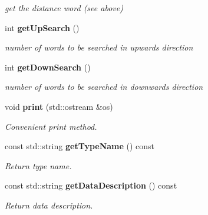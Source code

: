 \begin{DoxyCompactItemize}
\begin{DoxyCompactList}\small\item\em get the distance word (see above) \item\end{DoxyCompactList}\item 
int {\bf getUpSearch} ()\label{classCALICE_1_1TriggerCheck_af8a0117bed3941cb353693a7c3eface2}

\begin{DoxyCompactList}\small\item\em number of words to be searched in upwards direction \item\end{DoxyCompactList}\item 
int {\bf getDownSearch} ()\label{classCALICE_1_1TriggerCheck_a450b5f31d4d643303621dac8a09455bf}

\begin{DoxyCompactList}\small\item\em number of words to be searched in downwards direction \item\end{DoxyCompactList}\item 
void {\bf print} (std::ostream \&os)\label{classCALICE_1_1TriggerCheck_a2a2fd0d5f304e7d5c0ba892617bd84a1}

\begin{DoxyCompactList}\small\item\em Convenient print method. \item\end{DoxyCompactList}\item 
const std::string {\bf getTypeName} () const \label{classCALICE_1_1TriggerCheck_aaf8cece5cd4817d233e328c941c09563}

\begin{DoxyCompactList}\small\item\em Return type name. \item\end{DoxyCompactList}\item 
const std::string {\bf getDataDescription} () const \label{classCALICE_1_1TriggerCheck_a29fbc7d9375224b05332c577ef3279a5}

\begin{DoxyCompactList}\small\item\em Return data description. \item\end{DoxyCompactList}\end{DoxyCompactItemize}


